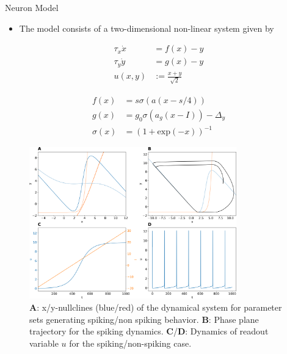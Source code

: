 \documentclass{beamer}
\begin{document}
\begin{frame}[t]
\begin{columns}[t]
\begin{column}{.45\textwidth}
\begin{myblock}{Neuron Model}
\begin{itemize}
\item The model consists of a two-dimensional non-linear system given by
\end{itemize}
\begin{minipage}[t]{.5\linewidth}
\begin{align*}
\tau_x \dot{x} &= f(x) - y  \\ 
\tau_y \dot{y} &= g(x) - y \\
u(x,y) &:= \frac{x+y}{\sqrt{2}}
\end{align*}
\end{minipage}%
\begin{minipage}[t]{.5\linewidth}
\begin{align*}
f(x) &= s \sigma \left(a\left(x-s/4\right)\right)  \\
g(x) &= g_0 \sigma\left(a_g\left(x-I\right)\right) - \Delta_y \\
\sigma(x) &= \left(1+\mathrm{exp}(-x)\right)^{-1}
\end{align*}
\end{minipage}
\begin{figure}
\centering
\includegraphics[width=0.8\textwidth]{../figures/graphics/dynamics_combined_figure.png}
\caption{\textbf{A}: x/y-nullclines (blue/red) of the dynamical system for parameter sets generating spiking/non spiking behavior. \textbf{B}: Phase plane trajectory for the spiking dynamics. \textbf{C}/\textbf{D}: Dynamics of readout variable $u$ for the spiking/non-spiking case.}
\label{fig:dynamics_illustr}
\end{figure}
\end{myblock}


\end{column}
\end{columns}
\end{frame}
\end{document}

